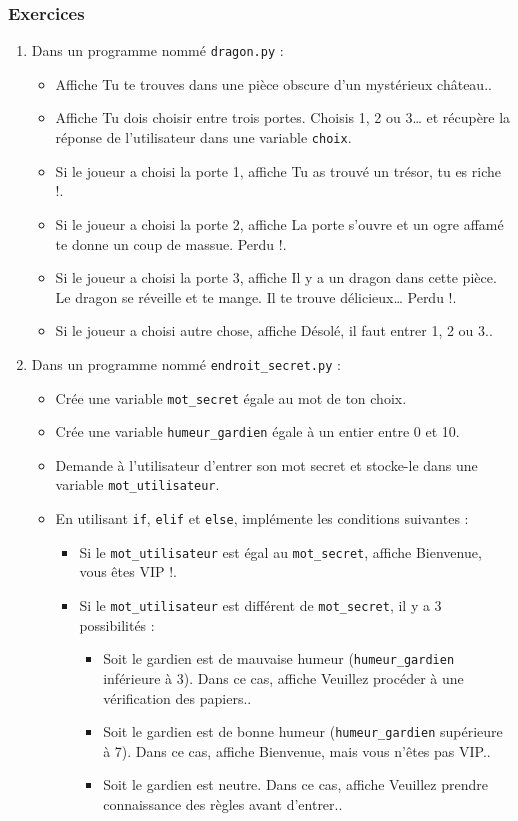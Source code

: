 \documentclass[11pt]{article}
\begin{document}
\subsubsection*{Exercices}
\label{sec:org2bc8733}
\begin{enumerate}
\item Dans un programme nommé \texttt{dragon.py} :
\begin{itemize}
\item Affiche \og Tu te trouves dans une pièce obscure d'un mystérieux château.\fg{}.
\item Affiche \og Tu dois choisir entre trois portes. Choisis 1, 2 ou 3\ldots{} \fg{} et récupère la réponse de l'utilisateur dans une variable \texttt{choix}.
\item Si le joueur a choisi la porte 1, affiche \og Tu as trouvé un trésor, tu es riche !\fg{}.
\item Si le joueur a choisi la porte 2, affiche \og La porte s'ouvre et un ogre affamé te donne un coup de massue. Perdu !\fg{}.
\item Si le joueur a choisi la porte 3, affiche \og Il y a un dragon dans cette pièce. Le dragon se réveille et te mange. Il te trouve délicieux\ldots{} Perdu !\fg{}.
\item Si le joueur a choisi autre chose, affiche \og Désolé, il faut entrer 1, 2 ou 3.\fg{}.
\end{itemize}

\item Dans un programme nommé \texttt{endroit\_secret.py} :
\begin{itemize}
\item Crée une variable \texttt{mot\_secret} égale au mot de ton choix.
\item Crée une variable \texttt{humeur\_gardien} égale à un entier entre 0 et 10.
\item Demande à l'utilisateur d'entrer son mot secret et stocke-le dans une variable \texttt{mot\_utilisateur}.
\item En utilisant \texttt{if}, \texttt{elif} et \texttt{else}, implémente les conditions suivantes :
\begin{itemize}
\item Si le \texttt{mot\_utilisateur} est égal au \texttt{mot\_secret}, affiche \og Bienvenue, vous êtes VIP !\fg{}.
\item Si le \texttt{mot\_utilisateur} est différent de \texttt{mot\_secret}, il y a 3 possibilités :
\begin{itemize}
\item Soit le gardien est de mauvaise humeur (\texttt{humeur\_gardien} inférieure à 3). Dans ce cas, affiche \og Veuillez procéder à une vérification des papiers.\fg{}.
\item Soit le gardien est de bonne humeur (\texttt{humeur\_gardien} supérieure à 7). Dans ce cas, affiche \og Bienvenue, mais vous n'êtes pas VIP.\fg{}.
\item Soit le gardien est neutre. Dans ce cas, affiche \og Veuillez prendre connaissance des règles avant d'entrer.\fg{}.
\end{itemize}
\end{itemize}
\end{itemize}
\end{enumerate}
\end{document}
